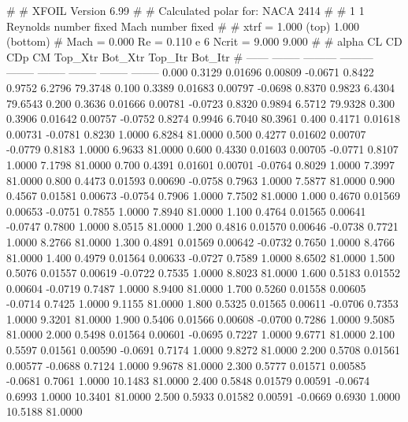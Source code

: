 #  
#       XFOIL         Version 6.99
#  
# Calculated polar for: NACA 2414                                       
#  
# 1 1 Reynolds number fixed          Mach number fixed         
#  
# xtrf =   1.000 (top)        1.000 (bottom)  
# Mach =   0.000     Re =     0.110 e 6     Ncrit =   9.000  9.000
#  
#   alpha    CL        CD       CDp       CM     Top_Xtr  Bot_Xtr  Top_Itr  Bot_Itr
#  ------ -------- --------- --------- -------- -------- -------- -------- --------
   0.000   0.3129   0.01696   0.00809  -0.0671   0.8422   0.9752   6.2796  79.3748
   0.100   0.3389   0.01683   0.00797  -0.0698   0.8370   0.9823   6.4304  79.6543
   0.200   0.3636   0.01666   0.00781  -0.0723   0.8320   0.9894   6.5712  79.9328
   0.300   0.3906   0.01642   0.00757  -0.0752   0.8274   0.9946   6.7040  80.3961
   0.400   0.4171   0.01618   0.00731  -0.0781   0.8230   1.0000   6.8284  81.0000
   0.500   0.4277   0.01602   0.00707  -0.0779   0.8183   1.0000   6.9633  81.0000
   0.600   0.4330   0.01603   0.00705  -0.0771   0.8107   1.0000   7.1798  81.0000
   0.700   0.4391   0.01601   0.00701  -0.0764   0.8029   1.0000   7.3997  81.0000
   0.800   0.4473   0.01593   0.00690  -0.0758   0.7963   1.0000   7.5877  81.0000
   0.900   0.4567   0.01581   0.00673  -0.0754   0.7906   1.0000   7.7502  81.0000
   1.000   0.4670   0.01569   0.00653  -0.0751   0.7855   1.0000   7.8940  81.0000
   1.100   0.4764   0.01565   0.00641  -0.0747   0.7800   1.0000   8.0515  81.0000
   1.200   0.4816   0.01570   0.00646  -0.0738   0.7721   1.0000   8.2766  81.0000
   1.300   0.4891   0.01569   0.00642  -0.0732   0.7650   1.0000   8.4766  81.0000
   1.400   0.4979   0.01564   0.00633  -0.0727   0.7589   1.0000   8.6502  81.0000
   1.500   0.5076   0.01557   0.00619  -0.0722   0.7535   1.0000   8.8023  81.0000
   1.600   0.5183   0.01552   0.00604  -0.0719   0.7487   1.0000   8.9400  81.0000
   1.700   0.5260   0.01558   0.00605  -0.0714   0.7425   1.0000   9.1155  81.0000
   1.800   0.5325   0.01565   0.00611  -0.0706   0.7353   1.0000   9.3201  81.0000
   1.900   0.5406   0.01566   0.00608  -0.0700   0.7286   1.0000   9.5085  81.0000
   2.000   0.5498   0.01564   0.00601  -0.0695   0.7227   1.0000   9.6771  81.0000
   2.100   0.5597   0.01561   0.00590  -0.0691   0.7174   1.0000   9.8272  81.0000
   2.200   0.5708   0.01561   0.00577  -0.0688   0.7124   1.0000   9.9678  81.0000
   2.300   0.5777   0.01571   0.00585  -0.0681   0.7061   1.0000  10.1483  81.0000
   2.400   0.5848   0.01579   0.00591  -0.0674   0.6993   1.0000  10.3401  81.0000
   2.500   0.5933   0.01582   0.00591  -0.0669   0.6930   1.0000  10.5188  81.0000
